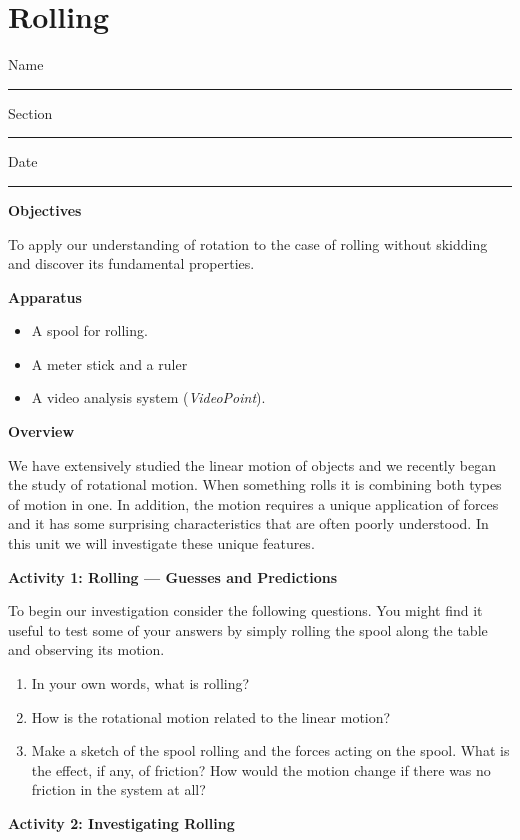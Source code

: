 
\section{Rolling}

Name \rule{2.0in}{0.1pt}\hfill{}Section \rule{1.0in}{0.1pt}\hfill{}Date \rule{1.0in}{0.1pt}

\textbf{Objectives }

To apply our understanding of rotation to the case of rolling without skidding
and discover its fundamental properties. 

\textbf{Apparatus}

\begin{itemize}
\item A spool for rolling. 
\item A meter stick and a ruler 
\item A video analysis system (\textit{VideoPoint}).
\end{itemize}
\textbf{Overview }

We have extensively studied the linear motion of objects and we recently began
the study of rotational motion. When something rolls it is combining both types
of motion in one. In addition, the motion requires a unique application of forces
and it has some surprising characteristics that are often poorly understood.
In this unit we will investigate these unique features.

\textbf{Activity 1: Rolling --- Guesses and Predictions }

To begin our investigation consider the following questions. You might find
it useful to test some of your answers by simply rolling the spool along the
table and observing its motion.

\begin{enumerate}
\item In your own words, what is rolling?\vspace{20mm}

\item How is the rotational motion related to the linear motion?\vspace{20mm}

\item Make a sketch of the spool rolling and the forces acting on the spool. What
is the effect, if any, of friction? How would the motion change if there was
no friction in the system at all?\vspace{30mm}

\end{enumerate}
\textbf{Activity 2: Investigating Rolling} 

